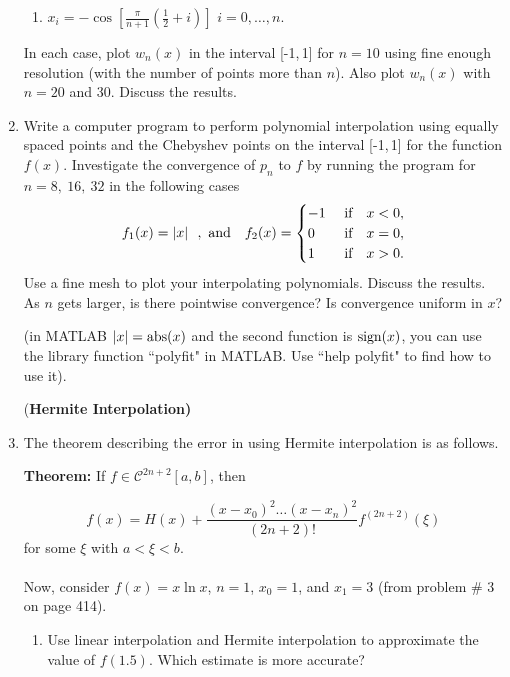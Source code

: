 \documentclass [12pt]{article}
\begin{document}
\begin{enumerate}
\begin{enumerate}
\item  $x_i=-\cos \left[{\displaystyle
\frac{\pi}{n+1}\left(\frac{1}{2} + i\right)}\right]$ \hskip 15pt
$i=0,\ldots,n$.

\end{enumerate}

In each case, plot $w_{n}(x)$ in the interval [-1,\,1] for $n=10$ using fine enough resolution (with the number of points more than $n$). Also plot $w_{n}(x)$ with $n=20$ and $30$. Discuss the results. 

\item Write a computer program to perform polynomial interpolation
using equally spaced points and the Chebyshev points on the
interval [-1,\,1] for the function $f(x)$. Investigate the
convergence of $p_n$ to $f$ by running the program for $n = 8, \ 16, \
32$ in the following cases
$$
f_1 (x) = |x| ~~ ,~\hbox{and} \quad
f_2 (x) = 
\begin{cases}
-1 & \ \mbox{if} \quad x < 0,\cr
                  0 \ & \ \mbox{if} \quad x = 0,\cr
                  1 \ & \ \mbox{if}  \quad x> 0.\cr
\end{cases}
$$
%
Use a fine mesh to plot your interpolating polynomials. Discuss the results.
As $n$ gets larger, is there pointwise convergence?
Is convergence uniform in $x$?

\vskip 8pt
\noindent
(in MATLAB $|x|=\mathop{\rm abs}\nolimits(x)$ and the second function is $\mathop{\rm sign}\nolimits(x)$, you can use the
library function ``polyfit" in MATLAB. Use ``help polyfit" to find how to use it).

\newpage

{(\bf Hermite Interpolation)}


\item \label{Hermite_error} 
The theorem describing
the error in using Hermite interpolation is as follows.

\textbf{Theorem:} If $f\in\mathscr{C}^{2n+2}[a,b]$, then

\[
f(x)=H(x)+\frac{(x-x_{0})^{2}\ldots(x-x_{n})^{2}}{(2n+2)!}f^{(2n+2)}(\xi)
\]
for some $\xi$ with $a<\xi<b$.\\
\\
Now, %
consider $f(x)=x \ln x$, $n=1$, $x_{0}=1$, and $x_{1}=3$ (from
problem \# 3 on page 414).

\begin{enumerate}

\item Use linear interpolation and Hermite interpolation to
approximate the value of $f(1.5)$. Which estimate is more
accurate?


\end{enumerate}
\end{enumerate}
\end{document}
